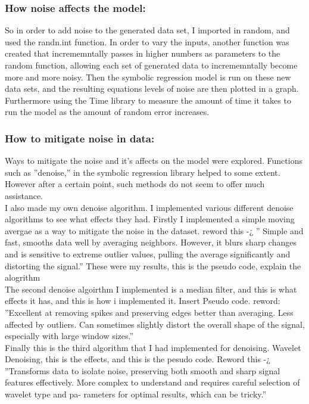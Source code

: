 \documentclass{article}
\begin{document}
\subsubsection{How noise affects the model: }
So in order to add noise to the generated data set, I imported in random, and used the randn.int function. In order
to vary the inputs, another function was created that incrememntally passes in higher numbers as parameters
to the random function, allowing each set of generated data to incrememntally become more and more noisy.
Then the symbolic regression model is run on these new data sets, and the resulting equations levels of noise
are then plotted in a graph. Furthermore using the Time library to measure the amount of time it takes to run
the model as the amount of random error increases.
\subsubsection{How to mitigate noise in data: }
 Ways to mitigate the noise and it’s affects on the model were explored. Functions such as ”denoise,” in the
symbolic regression library helped to some extent. However after a certain point, such methods do not seem to
offer much assistance.\\
I also made my own denoise algorithm. I implemented various different denoise algorithms to see what effects
they had. Firstly I implemented a simple moving avergae as a way to mitigate the noise in the dataset. reword
this -¿ ” Simple and fast, smooths data well by averaging neighbors. However, it blurs sharp changes and is
sensitive to extreme outlier values, pulling the average significantly and distorting the signal.”
These were my results, this is the pseudo code, explain the alogrithm\\

The second denoise algoirthm I implemented is a median filter, and this is what effects it has, and this is how
i implemented it. Insert Pseudo code. reword: ”Excellent at removing spikes and preserving edges better than
averaging. Less affected by outliers. Can sometimes slightly distort the overall shape of the signal, especially
with large window sizes.”\\

Finally this is the third algorithm that I had implemented for denoising. Wavelet Denoising, this is the effects,
and this is the pesudo code. Reword this -¿ ”Transforms data to isolate noise, preserving both smooth and sharp
signal features effectively. More complex to understand and requires careful selection of wavelet type and pa-
rameters for optimal results, which can be tricky.”\\
\end{document}
